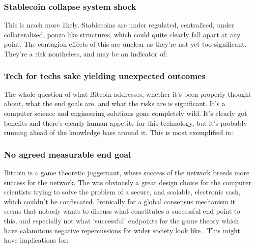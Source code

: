\subsubsection{Stablecoin collapse system shock}
This is much more likely. Stablecoins are under regulated, centralised, under collateralised, ponzo like structures, which could quite clearly fall apart at any point. The contagion effects of this are unclear as they're not yet too significant. They're a risk nontheless, and may be an indicator of:
\subsubsection{Tech for techs sake yielding unexpected outcomes}
The whole question of what Bitcoin addresses, whether it's been properly thought about, what the end goals are, and what the risks are is significant. It's a computer science and engineering solutions gone completely wild. It's clearly got benefits and there's clearly human appetite for this technology, but it's probably running ahead of the knowledge base around it. This is most exemplified in:
\subsubsection{No agreed measurable end goal}
 Bitcoin is a game theoretic juggernaut, where success of the network breeds more success for the network. The was obviously a great design choice for the computer scientists trying to solve the problem of a secure, and scalable, electronic cash, which couldn't be confiscated. Ironically for a global consensus mechanism it seems that nobody wants to discuss what constitutes a successful end point to this, and especially not what `successful' endpoints for the game theory which have calamitous negative repercussions for wider society look like \cite{warren2023bitcoin}.  This might have implications for:
